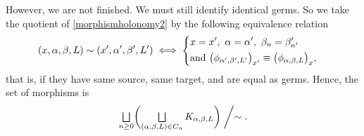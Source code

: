 \documentclass[JEP,XML,SOM,Unicode]{cedram}
\let\oldbigsqcup\bigsqcup
\renewcommand{\bigsqcup}{\mathop{\textstyle\oldbigsqcup}\displaylimits}
\theoremstyle{plain}
\theoremstyle{definition}
\theoremstyle{remark}
\numberwithin{equation}{section}
\let\uniondisjointe\bigsqcup
\begin{document}
However, we are not finished. We must still identify identical germs. So we take the quotient of \eqref{morphismholonomy2} by the following equivalence relation
\begin{equation}
\label{equiv}
(x,\alpha,\beta,L)\sim (x',\alpha',\beta',L')\iff
\left\{
\begin{aligned}
&x=x',\ \alpha=\alpha',\ \beta_n=\beta'_{n'}\cr
&\text{and }\big (\phi_{\alpha',\beta',L'}\big )_{x'}\equiv \big (\phi_{\alpha,\beta,L}\big )_x,
\end{aligned}
\right .
\end{equation}
that is, if they have same source, same target, and are equal as germs.
Hence, the set of morphisms is
\begin{equation}
\label{morphismholonomy3}
\uniondisjointe_{n\geq 0}\biggl (\uniondisjointe_{(\alpha,\beta, L) \in C_{n}} K_{\alpha,\beta, L}\biggr )\biggm /\sim.
\end{equation}
\end{document}
